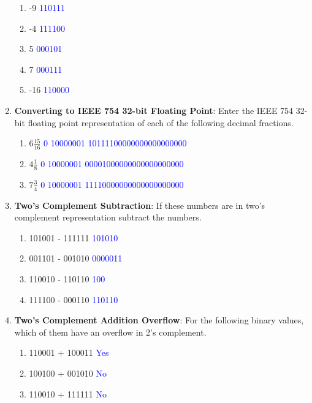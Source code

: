 \documentclass{article}
\begin{document}
\begin{enumerate}[label=(\alph*)]
    \begin{enumerate}[label=(\roman*)]
        \item -9 \textcolor{blue}{110111}
        \item -4 \textcolor{blue}{111100}
        \item 5 \textcolor{blue}{000101}
        \item 7 \textcolor{blue}{000111}
        \item -16 \textcolor{blue}{110000}
    \end{enumerate}
    \item \textbf{Converting to IEEE 754 32-bit Floating Point}: Enter the IEEE 754 32-bit floating point representation of each of the following decimal fractions.
    \begin{enumerate}[label=(\roman*)]
        \item $6 \frac{15}{16}$ \textcolor{blue}{0 10000001 10111100000000000000000}
        \item $4 \frac{1}{8}$ \textcolor{blue}{0 10000001 00001000000000000000000}
        \item $7 \frac{3}{4}$ \textcolor{blue}{0 10000001 11110000000000000000000}
    \end{enumerate}
    \item \textbf{Two's Complement Subtraction}: If these numbers are in two’s complement representation subtract the numbers.
    \begin{enumerate}[label=(\roman*)]
        \item 101001 - 111111 \textcolor{blue}{101010}
        \item 001101 - 001010 \textcolor{blue}{0000011}
        \item 110010 - 110110 \textcolor{blue}{100}
        \item 111100 - 000110 \textcolor{blue}{110110}
    \end{enumerate}
    \item \textbf{Two's Complement Addition Overflow}: For the following binary values, which of them have an overflow in 2’s complement.
    \begin{enumerate}[label=(\roman*)]
        \item 110001 + 100011 \textcolor{blue}{Yes}
        \item 100100 + 001010 \textcolor{blue}{No}
        \item 110010 + 111111 \textcolor{blue}{No}
    \end{enumerate}
\end{enumerate}
\newpage
\end{document}

